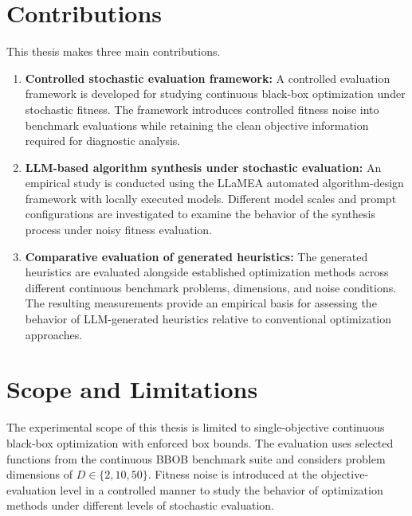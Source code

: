 \section{Contributions}
\label{sec:intro_contributions}

This thesis makes three main contributions.

\begin{enumerate}

    \item \textbf{Controlled stochastic evaluation framework:}
    A controlled evaluation framework is developed for studying continuous
    black-box optimization under stochastic fitness. The framework introduces
    controlled fitness noise into benchmark evaluations while retaining the
    clean objective information required for diagnostic analysis.

    \item \textbf{LLM-based algorithm synthesis under stochastic evaluation:}
    An empirical study is conducted using the LLaMEA automated algorithm-design
    framework with locally executed models. Different model scales and prompt
    configurations are investigated to examine the behavior of the synthesis
    process under noisy fitness evaluation.

    \item \textbf{Comparative evaluation of generated heuristics:}
    The generated heuristics are evaluated alongside established optimization
    methods across different continuous benchmark problems, dimensions, and
    noise conditions. The resulting measurements provide an empirical basis for
    assessing the behavior of LLM-generated heuristics relative to conventional
    optimization approaches.

\end{enumerate}

\section{Scope and Limitations}
\label{sec:intro_scope}

The experimental scope of this thesis is limited to single-objective
continuous black-box optimization with enforced box bounds. The evaluation
uses selected functions from the continuous BBOB benchmark suite and considers
problem dimensions of $D \in \{2,10,50\}$. Fitness noise is introduced at
the objective-evaluation level in a controlled manner to study the behavior
of optimization methods under different levels of stochastic evaluation.

